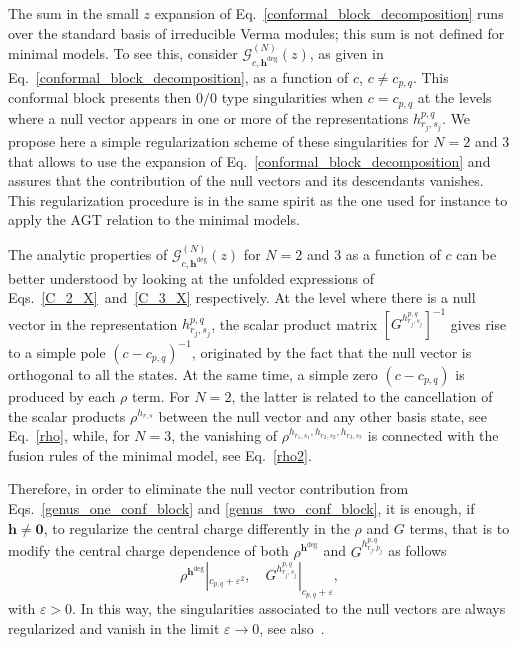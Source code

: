 \documentclass[a4paper,11pt]{article}
\begin{document}
The sum in the small $z$ expansion of Eq.~\eqref{conformal_block_decomposition} runs over the standard basis of irreducible Verma modules; this sum  is not defined for minimal models. To see this, consider $\mathcal{G}_{c, \boldsymbol{h}^{\text{deg}}}^{(N)}(z)$, as given in Eq.~\eqref{conformal_block_decomposition}, as a function of $c$, $c\neq c_{p,q}$.  This conformal block presents then $0/0$ type singularities when $c=c_{p, q}$ at the levels where a null vector appears in one or more of the representations $h_{r_j, s_j}^{p, q}$. We propose here a simple regularization scheme of these singularities for $N=2$ and $3$ that allows to use the expansion of Eq.~\eqref{conformal_block_decomposition} and assures that the contribution of the null vectors and its descendants vanishes. This regularization procedure is in the same spirit as the one used for instance to apply the AGT relation to the minimal models.

The analytic properties of $\mathcal{G}_{c, \boldsymbol{h}^{\text{deg}}}^{(N)}(z)$ for $N=2$ and $3$ as a function of $c$ can be better understood by looking at the unfolded expressions of Eqs.~\eqref{C_2_X}~and~\eqref{C_3_X} respectively. At the level where there is a null vector in the representation $h_{r_j, s_j}^{p, q}$, the scalar product matrix $\left[G^{h^{p,q}_{r_j,s_j}}\right]^{-1}$ gives rise to a simple pole $(c-c_{p, q})^{-1}$, originated by the fact that the null vector is orthogonal to all the states.  At the same time, a simple zero $(c-c_{p,q})$ is produced by each $\rho$ term. For $N=2$, the latter is related to the cancellation of the scalar products $\rho^{h_{r,s}}$ between the null vector and any other basis state, see Eq.~\eqref{rho}, while, for $N= 3$, the vanishing of $\rho^{h_{r_1,s_1},h_{r_2,s_2},h_{r_3,s_3}}$ is connected with the fusion rules of the minimal model, see Eq.~\eqref{rho2}.  

Therefore, in order to eliminate the null vector contribution from Eqs.~\eqref{genus_one_conf_block} and \eqref{genus_two_conf_block}, 
it is enough, if $\boldsymbol{h}\neq \boldsymbol{0}$, to regularize the central charge differently in the $\rho$ and $G$ terms, 
that is to modify the central charge dependence of both $\rho^{\boldsymbol{h}^{\text{deg}}}$ and $G^{h_{r_j, p_j}^{p, q}}$ as follows
\begin{equation}\label{regularization}
 \rho^{\boldsymbol{h}^{\text{deg}}}|_{c_{p,q}+\varepsilon^2},\quad  G^{h_{r_j, s_j}^{p, q}}|_{c_{p,q}+\varepsilon},
\end{equation}
with $\varepsilon>0$. In this way, the singularities associated to the null vectors are always regularized and vanish 
in the limit $\varepsilon\to 0$, see also~\cite{SV, Alkalaev}. 
\end{document}
